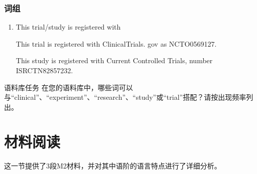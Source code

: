 \documentclass[a4paper]{ctexbook}
\begin{document}
    \subsubsection{词组}

    \begin{enumerate}
      \item This trial/study is registered with
      \begin{eg}{}
        This trial is registered with ClinicalTrials. gov as NCTO0569127.
      \end{eg}

      \begin{eg}{}
        This study is registered with Current Controlled Trials, number ISRCTN82857232.
      \end{eg}
    \end{enumerate}

    \begin{task}{语料库任务}
      在您的语料库中，哪些词可以与“clinical”、“experiment”、“research”、“study”或“trial”搭配？请按出现频率列出。
    \end{task}

\section{材料阅读}

这一节提供了3段M2材料，并对其中语阶的语言特点进行了详细分析。
\end{document}
